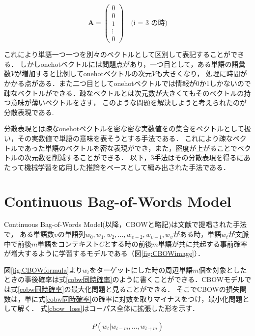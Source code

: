 \documentclass[a4j,11pt,report]{jsbook}
\begin{document}
\begin{equation}
  \label{onehot}
  \bm{A} = \left(
  \begin{array}{c}
    0 \\
    0 \\
    1 \\
    \vdots \\
    0
  \end{array}
  \right)
  \quad \text{(i = 3 の時)}
\end{equation}


これにより単語一つ一つを別々のベクトルとして区別して表記することができる．
しかしonehotベクトルには問題点があり，一つ目として，ある単語の語彙数$V$が増加すると比例してonehotベクトルの次元$V$も大きくなり，
処理に時間がかかる点がある．また二つ目としてonehotベクトルでは情報が0か1しかないので疎なベクトルができる．疎なベクトルとは次元数が大きくてもそのベクトルの持つ意味が薄いベクトルをさす，
このような問題を解決しようと考えられたのが分散表現である.

分散表現とは疎なonehotベクトルを密な密な実数値をの集合をベクトルとして扱い，その実数値で単語の意味を表そうとする手法である．
これにより疎なベクトルであった単語のベクトルを密な表現ができ，また，密度が上がることでベクトルの次元数を削減することができる．
以下，3手法はその分散表現を得るにあたって機械学習を応用した推論をベースとして編み出された手法である．

\clearpage
\section{Continuous Bag-of-Words Model\label{sec:CBOW}}
Continuous Bag-of-Words Model(以降，CBOWと略記)は文献\cite{SkipCBOW}で提唱された手法で，
ある単語数$\upsilon$の単語列$w_{0},w_{1},w_{2},\dots,w_{\upsilon-2},w_{\upsilon-1},w_{\upsilon}$がある時，単語$w_{t}$が文脈中で前後$m$単語をコンテキスト$C$とする時の前後$m$単語が共に共起する事前確率が増大するように学習するモデルである（図\ref{fig:CBOWimage}）．


図\ref{fig:CBOWformula}より$w_{t}$をターゲットにした時の周辺単語$m$個を対象としたときの事後確率は式\ref{cobw同時確率}のように書くことができる．CBOWモデルでは式\ref{cobw同時確率}の最大化問題と見ることができる．
そこでCBOWの損失関数は，単に式\ref{cobw同時確率}の確率に対数を取りマイナスをつけ，最小化問題として解く．
式\ref{cbow_loss}はコーパス全体に拡張した形を示す．



\begin{equation}[H]
  \label{cobw同時確率}
  \begin{array}{c}
    P(w_{t}|w_{t-m},...,w_{t+m})
  \end{array}
\end{equation}
\end{document}
